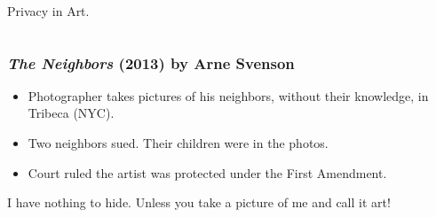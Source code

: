 \documentclass{beamer}
\begin{document}
\begin{frame}

\begin{columns}[c] %

    \begin{block}{}
      Privacy in Art.
    \end{block}



    \end{columns}


\end{frame}



\begin{frame}

\frametitle{\emph{The Neighbors} (2013) by Arne Svenson}

\begin{itemize}
\item Photographer takes pictures of his neighbors, without their
  knowledge,  in Tribeca (NYC).
\item Two neighbors sued.  Their children were in the photos.
\item Court ruled the artist was protected under the First Amendment.


\end{itemize}

\begin{block}{I have nothing to hide.}
    Unless you take a picture of me and call it art!
  \end{block}

\end{frame}
\end{document}
